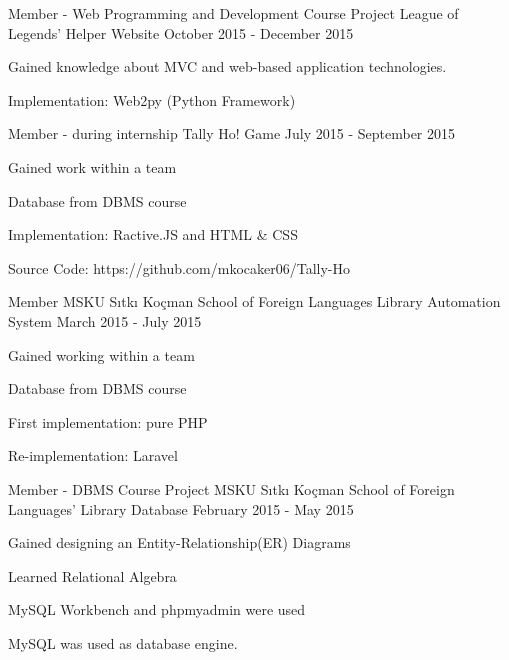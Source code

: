 \begin{cventries}
    \cventry
        {Member - Web Programming and Development Course Project}
        {League of Legends' Helper Website}
        {}
        {October 2015 - December 2015}
        {
            \begin{cvitems}
                \item {Gained knowledge about MVC and web-based application technologies.}
                \item {Implementation: Web2py (Python Framework)}
            \end{cvitems}
        }

    \cventry
        {Member - during internship}
        {Tally Ho! Game}
        {}
        {July 2015 - September 2015}
        {
            \begin{cvitems}
                \item {Gained work within a team}
                \item {Database from DBMS course}
                \item {Implementation: Ractive.JS and HTML \& CSS} 
                \item {Source Code: https://github.com/mkocaker06/Tally-Ho} 
            \end{cvitems}
        }

    \cventry
        {Member}
        {MSKU Sıtkı Koçman School of Foreign Languages Library Automation System}
        {}
        {March 2015 - July 2015}
        {
            \begin{cvitems}
                \item {Gained working within a team}
                \item {Database from DBMS course}
                \item {First implementation: pure PHP}
                \item {Re-implementation: Laravel}
            \end{cvitems}
        }

    \cventry
        {Member - DBMS Course Project}
        {MSKU Sıtkı Koçman School of Foreign Languages' Library Database}
        {}
        {February 2015 - May 2015}
        {
            \begin{cvitems}
                \item {Gained designing an Entity-Relationship(ER) Diagrams}
                \item {Learned Relational Algebra}
                \item {MySQL Workbench and phpmyadmin were used}
                \item {MySQL was used as database engine.}
            \end{cvitems}
        }

\end{cventries}

